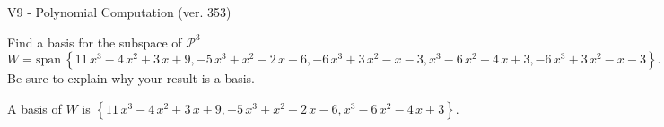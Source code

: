 \begin{exercise}
  \begin{exerciseTitle}V9 - Polynomial Computation (ver. 353)\end{exerciseTitle}
  \begin{exerciseStatement}
    Find a basis for the subspace of \(\mathcal{P}^3\) 
\[W=\mathrm{span}\ \left\{11 \, x^{3} - 4 \, x^{2} + 3 \, x + 9 , -5 \, x^{3} + x^{2} - 2 \, x - 6 , -6 \, x^{3} + 3 \, x^{2} - x - 3 , x^{3} - 6 \, x^{2} - 4 \, x + 3 , -6 \, x^{3} + 3 \, x^{2} - x - 3\right\}.\]
 Be sure to explain why your result is a basis.


  \end{exerciseStatement}
  \begin{exerciseAnswer}
   A basis of \(W\) is  \(\left\{11 \, x^{3} - 4 \, x^{2} + 3 \, x + 9 , -5 \, x^{3} + x^{2} - 2 \, x - 6 , x^{3} - 6 \, x^{2} - 4 \, x + 3\right\}\).
  


  \end{exerciseAnswer}
\end{exercise}